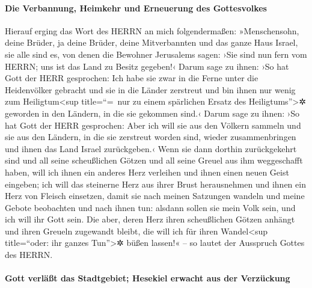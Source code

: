 \hypertarget{die-verbannung-heimkehr-und-erneuerung-des-gottesvolkes}{%
\paragraph{Die Verbannung, Heimkehr und Erneuerung des
Gottesvolkes}\label{die-verbannung-heimkehr-und-erneuerung-des-gottesvolkes}}

Hierauf erging das Wort des HERRN an mich folgendermaßen:
»Menschensohn, deine Brüder, ja deine Brüder, deine
Mitverbannten und das ganze Haus Israel, sie alle sind es, von denen die
Bewohner Jerusalems sagen: ›Sie sind nun fern vom HERRN; uns ist das
Land zu Besitz gegeben!‹ Darum sage zu ihnen: ›So hat
Gott der HERR gesprochen: Ich habe sie zwar in die Ferne unter die
Heidenvölker gebracht und sie in die Länder zerstreut und bin ihnen nur
wenig zum Heiligtum\textless sup title=``=~nur zu einem spärlichen
Ersatz des Heiligtums''\textgreater✲ geworden in den Ländern, in die sie
gekommen sind.‹ Darum sage zu ihnen: ›So hat Gott der
HERR gesprochen: Aber ich will sie aus den Völkern sammeln und sie aus
den Ländern, in die sie zerstreut worden sind, wieder zusammenbringen
und ihnen das Land Israel zurückgeben.‹ Wenn sie dann
dorthin zurückgekehrt sind und all seine scheußlichen Götzen und all
seine Greuel aus ihm weggeschafft haben, will ich ihnen
ein anderes Herz verleihen und ihnen einen neuen Geist eingeben; ich
will das steinerne Herz aus ihrer Brust herausnehmen und ihnen ein Herz
von Fleisch einsetzen, damit sie nach meinen Satzungen
wandeln und meine Gebote beobachten und nach ihnen tun: alsdann sollen
sie mein Volk sein, und ich will ihr Gott sein. Die aber,
deren Herz ihren scheußlichen Götzen anhängt und ihren Greueln zugewandt
bleibt, die will ich für ihren Wandel\textless sup title=``oder: ihr
ganzes Tun''\textgreater✲ büßen lassen!« -- so lautet der Ausspruch
Gottes des HERRN.

\hypertarget{gott-verluxe4uxdft-das-stadtgebiet-hesekiel-erwacht-aus-der-verzuxfcckung}{%
\paragraph{Gott verläßt das Stadtgebiet; Hesekiel erwacht aus der
Verzückung}\label{gott-verluxe4uxdft-das-stadtgebiet-hesekiel-erwacht-aus-der-verzuxfcckung}}

